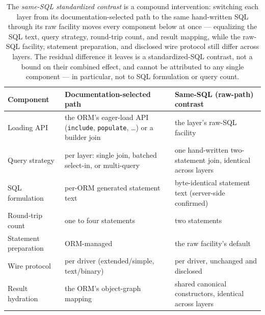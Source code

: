 \begin{table}[htbp]
  \centering
  \small
  \caption{The \emph{same-SQL standardized contrast} is a compound intervention: switching each layer from its
    documentation-selected path to the same hand-written SQL through its raw facility moves every
    component below at once --- equalizing the SQL text, query strategy, round-trip count, and
    result mapping, while the raw-SQL facility, statement preparation, and disclosed wire protocol
    still differ across layers. The residual difference it leaves is a standardized-SQL contrast,
    not a bound on their combined effect, and cannot be attributed to any single component ---
    in particular, not to SQL formulation or query count.}
  \label{tab:samesql_components}
  \begin{tabular}{@{}l p{} p{}@{}}
    \toprule
    Component & Documentation-selected path & Same-SQL (raw-path) contrast \\
    \midrule
    Loading API & the ORM's eager-load API (\texttt{include}, \texttt{populate}, \ldots) or a builder join & the layer's raw-SQL facility \\
    Query strategy & per layer: single join, batched select-in, or multi-query & one hand-written two-statement join, identical across layers \\
    SQL formulation & per-ORM generated statement text & byte-identical statement text (server-side confirmed) \\
    Round-trip count & one to four statements & two statements \\
    Statement preparation & ORM-managed & the raw facility's default \\
    Wire protocol & per driver (extended/simple, text/binary) & per driver, unchanged and disclosed \\
    Result hydration & the ORM's object-graph mapping & shared canonical constructors, identical across layers \\
    \bottomrule
  \end{tabular}
\end{table}
